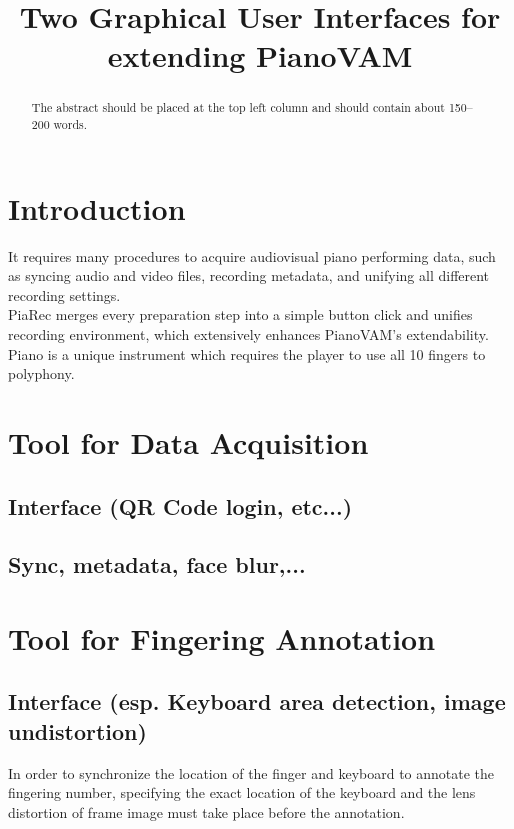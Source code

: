 \documentclass{article}
\title{Two Graphical User Interfaces for extending PianoVAM} %
\begin{document}
\maketitle

\begin{abstract}
The abstract should be placed at the top left column and should contain about 150--200 words.
\end{abstract}

\section{Introduction}\label{sec:introduction}
It requires many procedures to acquire audiovisual piano performing data, such as syncing audio and video files, recording metadata, and unifying all different recording settings. \\%
PiaRec merges every preparation step into a simple button click and unifies recording environment, which extensively enhances PianoVAM's extendability.\\ %
Piano is a unique instrument which requires the player to use all 10 fingers to polyphony. %


\section{Tool for Data Acquisition} %
\subsection{Interface (QR Code login, etc...)} 
\subsection{Sync, metadata, face blur,...}
\section{Tool for Fingering Annotation}
\subsection{Interface (esp. Keyboard area detection, image undistortion)}

In order to synchronize the location of the finger and keyboard to annotate the fingering number, specifying the exact location of the keyboard and the lens distortion of frame image must take place before the annotation. 
\end{document}
